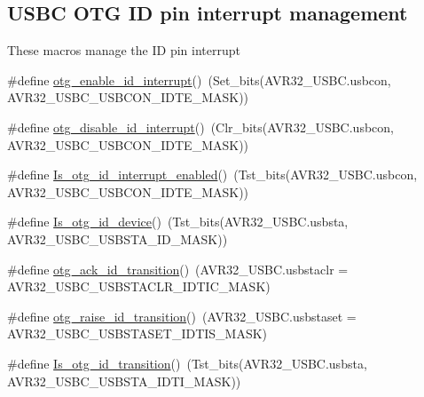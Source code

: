 \subsection*{\-U\-S\-B\-C \-O\-T\-G \-I\-D pin interrupt management}
\label{_amgrpb4d7c037f10d64941693e7f82d9338bc}%
 \-These macros manage the \-I\-D pin interrupt \begin{DoxyCompactItemize}
\item 
\#define \hyperlink{group__otg__group_ga873ba3797934aa55fdf0d179496e0e89}{otg\-\_\-enable\-\_\-id\-\_\-interrupt}()~(\-Set\-\_\-bits(\-A\-V\-R32\-\_\-\-U\-S\-B\-C.\-usbcon, \-A\-V\-R32\-\_\-\-U\-S\-B\-C\-\_\-\-U\-S\-B\-C\-O\-N\-\_\-\-I\-D\-T\-E\-\_\-\-M\-A\-S\-K))
\item 
\#define \hyperlink{group__otg__group_ga88d47c2dfdbd1c720326b011db6a7ebd}{otg\-\_\-disable\-\_\-id\-\_\-interrupt}()~(\-Clr\-\_\-bits(\-A\-V\-R32\-\_\-\-U\-S\-B\-C.\-usbcon, \-A\-V\-R32\-\_\-\-U\-S\-B\-C\-\_\-\-U\-S\-B\-C\-O\-N\-\_\-\-I\-D\-T\-E\-\_\-\-M\-A\-S\-K))
\item 
\#define \hyperlink{group__otg__group_gaee416d9364a73b24f67271cab0f697c5}{\-Is\-\_\-otg\-\_\-id\-\_\-interrupt\-\_\-enabled}()~(\-Tst\-\_\-bits(\-A\-V\-R32\-\_\-\-U\-S\-B\-C.\-usbcon, \-A\-V\-R32\-\_\-\-U\-S\-B\-C\-\_\-\-U\-S\-B\-C\-O\-N\-\_\-\-I\-D\-T\-E\-\_\-\-M\-A\-S\-K))
\item 
\#define \hyperlink{group__otg__group_ga75ab090e520e22605a84c77048814e9a}{\-Is\-\_\-otg\-\_\-id\-\_\-device}()~(\-Tst\-\_\-bits(\-A\-V\-R32\-\_\-\-U\-S\-B\-C.\-usbsta, \-A\-V\-R32\-\_\-\-U\-S\-B\-C\-\_\-\-U\-S\-B\-S\-T\-A\-\_\-\-I\-D\-\_\-\-M\-A\-S\-K))
\item 
\#define \hyperlink{group__otg__group_ga473adb587b33ff08bc9afa2a916087b0}{otg\-\_\-ack\-\_\-id\-\_\-transition}()~(\-A\-V\-R32\-\_\-\-U\-S\-B\-C.\-usbstaclr = \-A\-V\-R32\-\_\-\-U\-S\-B\-C\-\_\-\-U\-S\-B\-S\-T\-A\-C\-L\-R\-\_\-\-I\-D\-T\-I\-C\-\_\-\-M\-A\-S\-K)
\item 
\#define \hyperlink{group__otg__group_ga221ed96e5450a2d29fdf265a99c430fc}{otg\-\_\-raise\-\_\-id\-\_\-transition}()~(\-A\-V\-R32\-\_\-\-U\-S\-B\-C.\-usbstaset = \-A\-V\-R32\-\_\-\-U\-S\-B\-C\-\_\-\-U\-S\-B\-S\-T\-A\-S\-E\-T\-\_\-\-I\-D\-T\-I\-S\-\_\-\-M\-A\-S\-K)
\item 
\#define \hyperlink{group__otg__group_gad080cf4cce7110b5540021accd4e7f4c}{\-Is\-\_\-otg\-\_\-id\-\_\-transition}()~(\-Tst\-\_\-bits(\-A\-V\-R32\-\_\-\-U\-S\-B\-C.\-usbsta, \-A\-V\-R32\-\_\-\-U\-S\-B\-C\-\_\-\-U\-S\-B\-S\-T\-A\-\_\-\-I\-D\-T\-I\-\_\-\-M\-A\-S\-K))
\end{DoxyCompactItemize}


